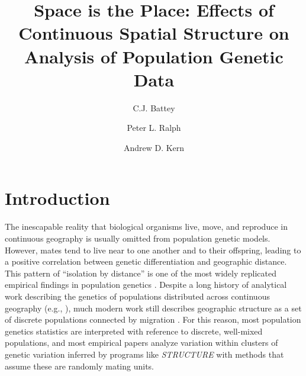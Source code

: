 \documentclass[10pt,twoside,lineno,hidelinks]{preprint}
\title{Space is the Place: Effects of Continuous Spatial Structure on Analysis of Population Genetic Data}
\author[$\ast$,1]{C.J. Battey}
\author[$\ast, \dagger$]{Peter L. Ralph}
\author[$\ast, \dagger$]{Andrew D. Kern}
\affil[$\ast$]{University of Oregon Dept. Biology, Institute for Ecology Evolution}
\begin{document}
\maketitle
\thispagestyle{firststyle}
\firstpagefootnote


\vspace{-35pt}%

\section{Introduction}

The inescapable reality that biological organisms live, move, and reproduce in continuous geography is usually omitted from population genetic models. However, mates tend to live near to one another and to their offspring, leading to a positive correlation between genetic differentiation and geographic distance. This pattern of ``isolation by distance'' \citep{Wright1943} is one of the most widely replicated empirical findings in population genetics \citep{Chen2017,Jay2012,Sharbel2000}.
Despite a long history of analytical work describing the genetics of populations distributed across continuous geography
(e.g., \citet{Wright1943,Rousset1997,barton2002neutral,Barton2010,Ringbauer2017,robledoarnuncio2010isolation,Wilkins2002linearcoalescent,Wilkins2004septimescales}), 
much modern work still describes geographic structure as a set of discrete populations connected by migration \citep[e.g.,][]{Wright1931,epperson2003geographical,rousset2011likelihoodbased,Shirk2014,lundgren2018populations,al2019estimating}. For this reason, most population genetics statistics are interpreted with reference to discrete, well-mixed populations, and most empirical papers analyze variation within clusters of genetic variation inferred by programs like \textit{STRUCTURE} \citep{Pritchard2000} with methods that assume these are randomly mating units.
\end{document}
